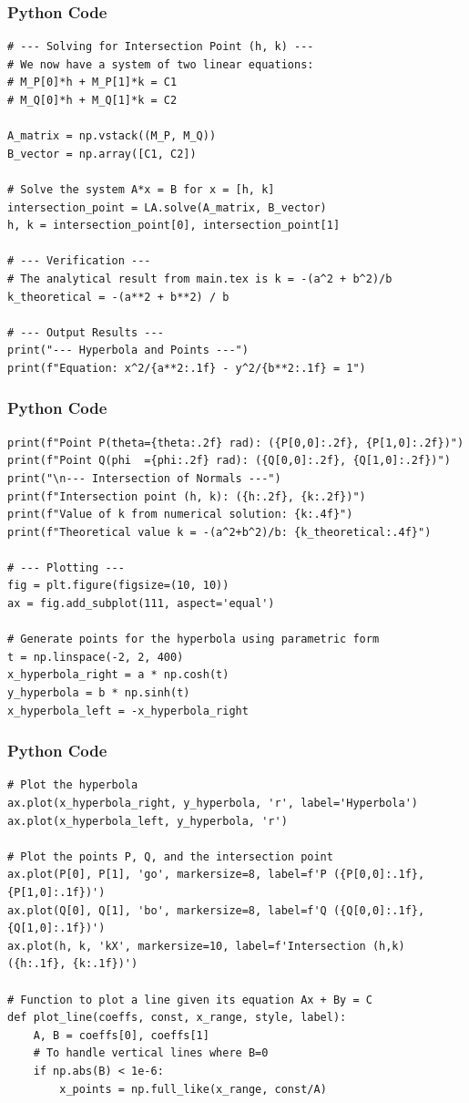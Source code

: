 \documentclass{beamer}
\begin{document}
\begin{frame}[fragile]
\frametitle{Python Code}
\begin{lstlisting}
# --- Solving for Intersection Point (h, k) ---
# We now have a system of two linear equations:
# M_P[0]*h + M_P[1]*k = C1
# M_Q[0]*h + M_Q[1]*k = C2

A_matrix = np.vstack((M_P, M_Q))
B_vector = np.array([C1, C2])

# Solve the system A*x = B for x = [h, k]
intersection_point = LA.solve(A_matrix, B_vector)
h, k = intersection_point[0], intersection_point[1]

# --- Verification ---
# The analytical result from main.tex is k = -(a^2 + b^2)/b
k_theoretical = -(a**2 + b**2) / b

# --- Output Results ---
print("--- Hyperbola and Points ---")
print(f"Equation: x^2/{a**2:.1f} - y^2/{b**2:.1f} = 1")
\end{lstlisting}
\end{frame}
\begin{frame}[fragile]
\frametitle{Python Code}
\begin{lstlisting}
print(f"Point P(theta={theta:.2f} rad): ({P[0,0]:.2f}, {P[1,0]:.2f})")
print(f"Point Q(phi  ={phi:.2f} rad): ({Q[0,0]:.2f}, {Q[1,0]:.2f})")
print("\n--- Intersection of Normals ---")
print(f"Intersection point (h, k): ({h:.2f}, {k:.2f})")
print(f"Value of k from numerical solution: {k:.4f}")
print(f"Theoretical value k = -(a^2+b^2)/b: {k_theoretical:.4f}")

# --- Plotting ---
fig = plt.figure(figsize=(10, 10))
ax = fig.add_subplot(111, aspect='equal')

# Generate points for the hyperbola using parametric form
t = np.linspace(-2, 2, 400)
x_hyperbola_right = a * np.cosh(t)
y_hyperbola = b * np.sinh(t)
x_hyperbola_left = -x_hyperbola_right
\end{lstlisting}
\end{frame}
\begin{frame}[fragile]
\frametitle{Python Code}
\begin{lstlisting}
# Plot the hyperbola
ax.plot(x_hyperbola_right, y_hyperbola, 'r', label='Hyperbola')
ax.plot(x_hyperbola_left, y_hyperbola, 'r')

# Plot the points P, Q, and the intersection point
ax.plot(P[0], P[1], 'go', markersize=8, label=f'P ({P[0,0]:.1f}, {P[1,0]:.1f})')
ax.plot(Q[0], Q[1], 'bo', markersize=8, label=f'Q ({Q[0,0]:.1f}, {Q[1,0]:.1f})')
ax.plot(h, k, 'kX', markersize=10, label=f'Intersection (h,k) ({h:.1f}, {k:.1f})')

# Function to plot a line given its equation Ax + By = C
def plot_line(coeffs, const, x_range, style, label):
    A, B = coeffs[0], coeffs[1]
    # To handle vertical lines where B=0
    if np.abs(B) < 1e-6:
        x_points = np.full_like(x_range, const/A)
        \end{lstlisting}
\end{frame}
\end{document}
